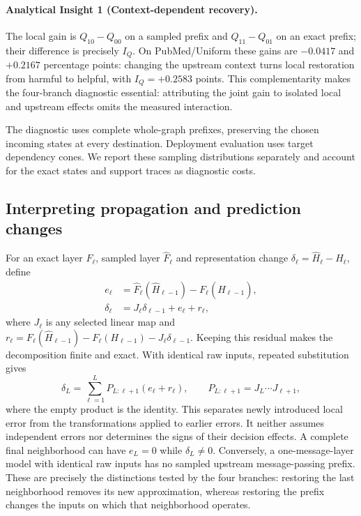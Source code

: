 \documentclass[sigconf, nonacm]{acmart}
\begin{document}
\paragraph{\normalfont\bfseries Analytical Insight 1 (Context-dependent recovery).}
The local gain is $Q_{10}-Q_{00}$ on a sampled prefix and $Q_{11}-Q_{01}$ on an exact prefix; their difference is precisely $I_Q$. On PubMed/Uniform these gains are $-0.0417$ and $+0.2167$ percentage points: changing the upstream context turns local restoration from harmful to helpful, with $I_Q=+0.2583$ points. This complementarity makes the four-branch diagnostic essential: attributing the joint gain to isolated local and upstream effects omits the measured interaction.

The diagnostic uses complete whole-graph prefixes, preserving the chosen incoming states at every destination. Deployment evaluation uses target dependency cones. We report these sampling distributions separately and account for the exact states and support traces as diagnostic costs.

\subsection{Interpreting propagation and prediction changes}
For an exact layer $F_\ell$, sampled layer $\widehat F_\ell$ and representation change $\delta_\ell=\widehat H_\ell-H_\ell$, define
\begin{align}
e_\ell&=\widehat F_\ell(\widehat H_{\ell-1})-F_\ell(\widehat H_{\ell-1}),\\
\delta_\ell&=J_\ell\delta_{\ell-1}+e_\ell+r_\ell,
\label{eq:prop}
\end{align}
where $J_\ell$ is any selected linear map and $r_\ell=F_\ell(\widehat H_{\ell-1})-F_\ell(H_{\ell-1})-J_\ell\delta_{\ell-1}$. Keeping this residual makes the decomposition finite and exact. With identical raw inputs, repeated substitution gives
\begin{equation}
\delta_L=\sum_{\ell=1}^{L}P_{L:\ell+1}(e_\ell+r_\ell),
\qquad P_{L:\ell+1}=J_L\cdots J_{\ell+1},
\label{eq:unrolled}
\end{equation}
where the empty product is the identity. This separates newly introduced local error from the transformations applied to earlier errors. It neither assumes independent errors nor determines the signs of their decision effects. A complete final neighborhood can have $e_L=0$ while $\delta_L\ne0$. Conversely, a one-message-layer model with identical raw inputs has no sampled upstream message-passing prefix. These are precisely the distinctions tested by the four branches: restoring the last neighborhood removes its new approximation, whereas restoring the prefix changes the inputs on which that neighborhood operates.
\end{document}
